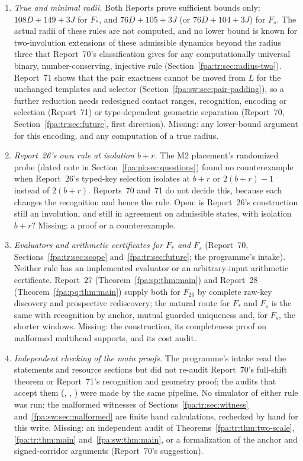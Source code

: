 \documentclass[11pt,a4paper]{article}
\numberwithin{equation}{section}
\begin{document}
\begin{enumerate}
\item \emph{True and minimal radii.} Both Reports prove sufficient bounds only: $108D+149+3J$ for $F_*$, and $76D+105+3J$ (or $76D+104+3J$) for $F_s$. The actual radii of these rules are not computed, and no lower bound is known for two-involution extensions of these admissible dynamics beyond the radius three that Report~70's classification gives for any computationally universal binary, number-conserving, injective rule (Section~\ref{fpa:tr:sec:radius-two}). Report~71 shows that the pair exactness cannot be moved from $L$ for the unchanged templates and selector (Section~\ref{fpa:sw:sec:pair-padding}), so a further reduction needs redesigned contact ranges, recognition, encoding or selection (Report~71) or type-dependent geometric separation (Report~70, Section~\ref{fpa:tr:sec:future}, first direction). Missing: any lower-bound argument for this encoding, and any computation of a true radius.
\item \emph{Report~26's own rule at isolation $b+r$.} The M2 placement's randomized probe (dated note in Section~\ref{fpa:pi:sec:questions}) found no counterexample when Report~26's typed-key selection isolates at $b+r$ or $2(b+r)-1$ instead of $2(b+r)$. Reports~70 and~71 do not decide this, because each changes the recognition and hence the rule. Open: is Report~26's construction still an involution, and still in agreement on admissible states, with isolation $b+r$? Missing: a proof or a counterexample.
\item \emph{Evaluators and arithmetic certificates for $F_*$ and $F_s$} (Report~70, Sections~\ref{fpa:tr:sec:scope} and~\ref{fpa:tr:sec:future}; the programme's intake). Neither rule has an implemented evaluator or an arbitrary-input arithmetic certificate. Report~27 (Theorem~\ref{fpa:sp:thm:main}) and Report~28 (Theorem~\ref{fpa:pq:thm:main}) supply both for $F_{26}$ by complete raw-key discovery and prospective rediscovery; the natural route for $F_*$ and $F_s$ is the same with recognition by anchor, mutual guarded uniqueness and, for $F_s$, the shorter windows. Missing: the construction, its completeness proof on malformed multihead supports, and its cost audit.
\item \emph{Independent checking of the main proofs.} The programme's intake read the statements and resource sections but did not re-audit Report~70's full-shift theorem or Report~71's recognition and geometry proof; the audits that accept them (, , ) were made by the same pipeline. No simulator of either rule was run; the malformed witnesses of Sections~\ref{fpa:tr:sec:witness} and~\ref{fpa:sw:sec:malformed} are finite hand calculations, rechecked by hand for this write. Missing: an independent audit of Theorems~\ref{fpa:tr:thm:two-scale}, \ref{fpa:tr:thm:main} and~\ref{fpa:sw:thm:main}, or a formalization of the anchor and signed-corridor arguments (Report~70's suggestion).
\end{enumerate}
\end{document}
